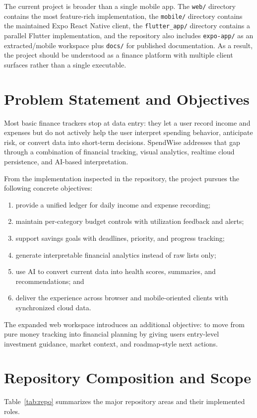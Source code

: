 \documentclass[conference]{IEEEtran}
\begin{document}
The current project is broader than a single mobile app. The \texttt{web/} directory contains the most feature-rich implementation, the \texttt{mobile/} directory contains the maintained Expo React Native client, the \texttt{flutter\_app/} directory contains a parallel Flutter implementation, and the repository also includes \texttt{expo-app/} as an extracted/mobile workspace plus \texttt{docs/} for published documentation. As a result, the project should be understood as a finance platform with multiple client surfaces rather than a single executable.

\section{Problem Statement and Objectives}
Most basic finance trackers stop at data entry: they let a user record income and expenses but do not actively help the user interpret spending behavior, anticipate risk, or convert data into short-term decisions. SpendWise addresses that gap through a combination of financial tracking, visual analytics, realtime cloud persistence, and AI-based interpretation.

From the implementation inspected in the repository, the project pursues the following concrete objectives:
\begin{enumerate}
\item provide a unified ledger for daily income and expense recording;
\item maintain per-category budget controls with utilization feedback and alerts;
\item support savings goals with deadlines, priority, and progress tracking;
\item generate interpretable financial analytics instead of raw lists only;
\item use AI to convert current data into health scores, summaries, and recommendations; and
\item deliver the experience across browser and mobile-oriented clients with synchronized cloud data.
\end{enumerate}

The expanded web workspace introduces an additional objective: to move from pure money tracking into financial planning by giving users entry-level investment guidance, market context, and roadmap-style next actions.

\section{Repository Composition and Scope}
Table~\ref{tab:repo} summarizes the major repository areas and their implemented roles.
\end{document}
